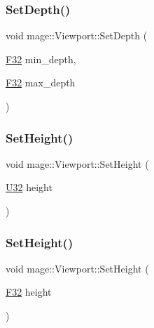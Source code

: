 \hypertarget{classmage_1_1_viewport_a15a328f7feb3f17dc1c9af47f30dce3b}{}\label{classmage_1_1_viewport_a15a328f7feb3f17dc1c9af47f30dce3b} 
\subsubsection{\texorpdfstring{Set\+Depth()}{SetDepth()}}
{\footnotesize\ttfamily void mage\+::\+Viewport\+::\+Set\+Depth (\begin{DoxyParamCaption}\item[{\hyperlink{namespacemage_aa97e833b45f06d60a0a9c4fc22ae02c0}{F32}}]{min\+\_\+depth,  }\item[{\hyperlink{namespacemage_aa97e833b45f06d60a0a9c4fc22ae02c0}{F32}}]{max\+\_\+depth }\end{DoxyParamCaption})\hspace{0.3cm}{\ttfamily [noexcept]}}

\hypertarget{classmage_1_1_viewport_abe55d91495584c60ff1bc91a7f286329}{}\label{classmage_1_1_viewport_abe55d91495584c60ff1bc91a7f286329} 
\subsubsection{\texorpdfstring{Set\+Height()}{SetHeight()}\hspace{0.1cm}{\footnotesize\ttfamily [1/2]}}
{\footnotesize\ttfamily void mage\+::\+Viewport\+::\+Set\+Height (\begin{DoxyParamCaption}\item[{\hyperlink{namespacemage_a41c104c036fba3756a74e19f793eeaa1}{U32}}]{height }\end{DoxyParamCaption})\hspace{0.3cm}{\ttfamily [noexcept]}}

\hypertarget{classmage_1_1_viewport_a70a89b84a3dbe79475e10b4a61c0a34c}{}\label{classmage_1_1_viewport_a70a89b84a3dbe79475e10b4a61c0a34c} 
\subsubsection{\texorpdfstring{Set\+Height()}{SetHeight()}\hspace{0.1cm}{\footnotesize\ttfamily [2/2]}}
{\footnotesize\ttfamily void mage\+::\+Viewport\+::\+Set\+Height (\begin{DoxyParamCaption}\item[{\hyperlink{namespacemage_aa97e833b45f06d60a0a9c4fc22ae02c0}{F32}}]{height }\end{DoxyParamCaption})\hspace{0.3cm}{\ttfamily [noexcept]}}

